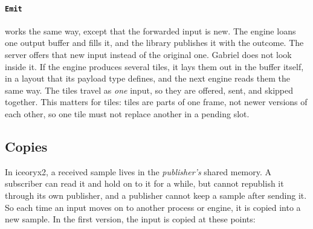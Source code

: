 \documentclass[11pt]{article}
\newcommand{\code}[1]{\texttt{#1}}
\begin{document}
\paragraph{\code{Emit}} works the same way, except that the forwarded input is
new. The engine loans one output buffer and fills it, and the library
publishes it with the outcome. The server offers that new input instead of the
original one. Gabriel does not look inside it. If the engine produces several
tiles, it lays them out in the buffer itself, in a layout that its payload
type defines, and the next engine reads them the same way. The tiles travel as
\emph{one} input, so they are offered, sent, and skipped together. This
matters for tiles: tiles are parts of one frame, not newer versions of each
other, so one tile must not replace another in a pending slot.

\subsection{Copies}
\label{sec:data}
\label{sec:copies}

In iceoryx2, a received sample lives in the \emph{publisher's} shared memory.
A subscriber can read it and hold on to it for a while, but cannot republish it
through its own publisher, and a publisher cannot keep a sample after sending
it. So each time an input moves on to another process or engine, it is copied
into a new sample. In the first version, the input is copied at these points:
\end{document}
